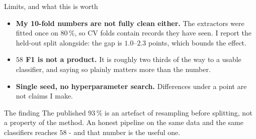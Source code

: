 \documentclass[xcolor=dvipsnames, aspectratio=169]{beamer}
\begin{document}
\begin{frame}{Limits, and what this is worth}
    \begin{itemize}\setlength\itemsep{0.35em}
        \item \textbf{My 10-fold numbers are not fully clean either.} The extractors
              were fitted once on $80\,\%$, so CV folds contain records they have
              seen. I report the held-out split alongside: the gap is
              \alert{$1.0$--$2.3$ points}, which bounds the effect.
        \item \textbf{$58$ F1 is not a product.} It is roughly two thirds of the way
              to a usable classifier, and saying so plainly matters more than the
              number.
        \item \textbf{Single seed, no hyperparameter search.} Differences under a
              point are not claims I make.
    \end{itemize}

    \vspace{0.6em}
    \begin{block}{The finding}
        The published $93\,\%$ is an artefact of resampling before splitting, not a
        property of the method. An honest pipeline on the same data and the same
        classifiers reaches $58$ - and that number is the useful one.
    \end{block}
\end{frame}
\end{document}
